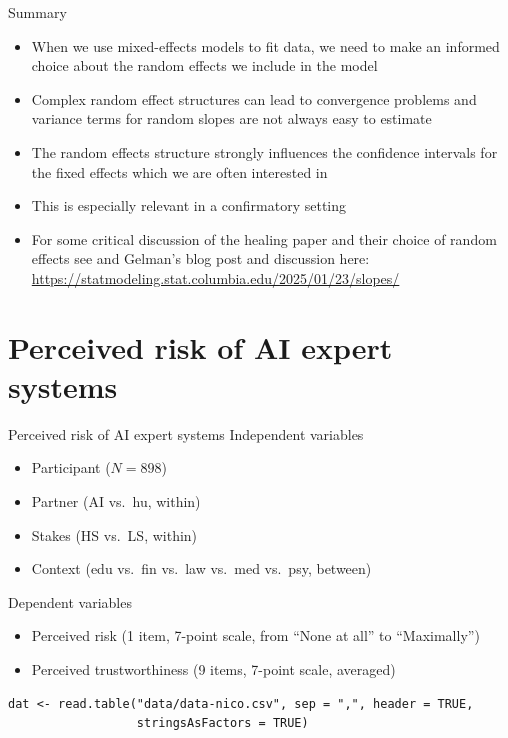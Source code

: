 \documentclass[aspectratio=169]{beamer}
\begin{document}
\begin{frame}[<+->]{Summary}
  \begin{itemize}
    \item When we use mixed-effects models to fit data, we need to make an
      informed choice about the random effects we include in the model
    \item Complex random effect structures can lead to convergence problems and
      variance terms for random slopes are not always easy to estimate
    \item The random effects structure strongly influences the confidence
      intervals for the fixed effects which we are often interested in
    \item This is especially relevant in a confirmatory setting
    \item For some critical discussion of the healing paper and their choice of
      random effects see \citet{Gelman2024} and Gelman's blog post and
      discussion here:
      \url{https://statmodeling.stat.columbia.edu/2025/01/23/slopes/}
  \end{itemize}
\end{frame}

\section[AIES]{Perceived risk of AI expert systems}

\begin{frame}[fragile]{Perceived risk of AI expert systems}
  Independent variables
  \begin{itemize}
    \item Participant ($N = 898$)
    \item Partner (AI vs.\ hu, within)
    \item Stakes (HS vs.\ LS, within)
    \item Context (edu vs.\ fin vs.\ law vs.\ med vs.\ psy, between)
  \end{itemize}
  Dependent variables
  \begin{itemize}
    \item Perceived risk (1 item, 7-point scale, from ``None at all'' to
      ``Maximally'')
    \item Perceived trustworthiness (9 items, 7-point scale, averaged)
  \end{itemize}
  \begin{lstlisting}
dat <- read.table("data/data-nico.csv", sep = ",", header = TRUE,
                  stringsAsFactors = TRUE)
  \end{lstlisting}
\end{frame}
\end{document}

